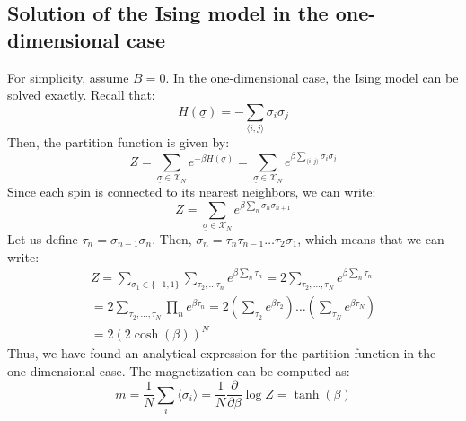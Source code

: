 \subsection{Solution of the Ising model in the one-dimensional case}
For simplicity, assume $B=0$. In the one-dimensional case, the Ising model can be solved exactly. Recall that:
\begin{equation}
    H(\underline{\sigma}) = -\sum_{\langle i,j\rangle}\sigma_i\sigma_j
\end{equation}
Then, the partition function is given by:
\begin{equation}
    Z = \sum_{\underline{\sigma}\in\mathcal{X}_N}e^{-\beta H(\underline{\sigma})} =
    \sum_{\underline{\sigma}\in\mathcal{X}_N}e^{\beta\sum_{\langle i,j\rangle}\sigma_i\sigma_j}
\end{equation}
Since each spin is connected to its nearest neighbors, we can write:
\begin{equation}
    Z =  \sum_{\underline{\sigma}\in\mathcal{X}_N}e^{\beta\sum_n\sigma_n\sigma_{n+1}}
\end{equation}
Let us define $\tau_n = \sigma_{n-1}\sigma_{n}$. Then, $\sigma_n = \tau_n\tau_{n-1}\dots\tau_2\sigma_1$, which means that we can write:
\begin{equation}
    \begin{gathered}
    Z =  \sum_{\sigma_1\in\{-1,1\}}\sum_{\tau_2,\dots\tau_n}e^{\beta\sum_n\tau_n}
    = 2\sum_{\tau_2,\dots,\tau_N}e^{\beta\sum_n\tau_n}\\
    = 2\sum_{\tau_2,\dots,\tau_N}\prod_n e^{\beta\tau_n}
    = 2(\sum_{\tau_2}e^{\beta\tau_2})\dots(\sum_{\tau_N}e^{\beta\tau_N})\\
    = 2(2\cosh(\beta))^{N}
    \end{gathered}
\end{equation}
Thus, we have found an analytical expression for the partition function in the one-dimensional case. The magnetization can be computed as:
\begin{equation}
    \label{eq:ising}
    m = \frac{1}{N}\sum_i \langle \sigma_i \rangle = \frac{1}{N}\frac{\partial}{\partial \beta}\log Z = \tanh(\beta)
\end{equation}


